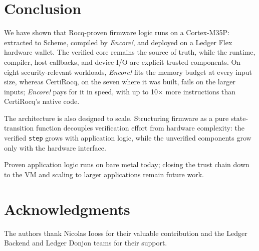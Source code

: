 \documentclass[runningheads]{llncs}
\newcommand{\encore}{\textit{Encore!}}
\newcommand{\code}[1]{\texttt{#1}}
\begin{document}
\section{Conclusion}

We have shown that Rocq-proven firmware logic runs on a Cortex-M35P: extracted to Scheme, compiled by \encore, and deployed on a Ledger Flex hardware wallet.
The verified core remains the source of truth, while the runtime, compiler, host callbacks, and device I/O are explicit trusted components.
On eight security-relevant workloads, \encore{} fits the memory budget at every input size, whereas CertiRocq, on the seven where it was built, fails on the larger inputs; \encore{} pays for it in speed, with up to 10$\times$ more instructions than CertiRocq's native code.

The architecture is also designed to scale.
Structuring firmware as a pure state-transition function decouples verification effort from hardware complexity: the verified \code{step} grows with application logic, while the unverified components grow only with the hardware interface.

Proven application logic runs on bare metal today; closing the trust chain down to the VM and scaling to larger applications remain future work.

\section*{Acknowledgments}
The authors thank Nicolas Iooss for their valuable contribution and the Ledger Backend and Ledger Donjon teams for their support.



\end{document}
